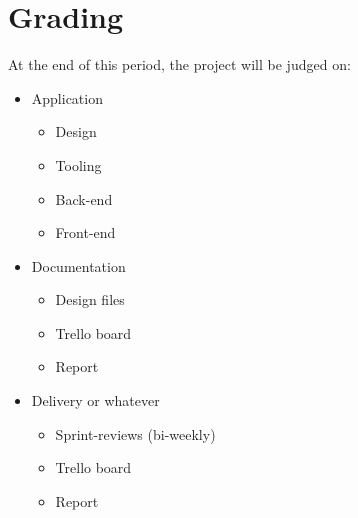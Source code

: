 \section{Grading}
At the end of this period, the project will be judged on:

\begin{itemize}
  \item Application
    \begin{itemize}
      \item{Design}
      \item{Tooling}
      \item{Back-end}
      \item{Front-end}
    \end{itemize}
  \item {Documentation}
    \begin{itemize}
      \item{Design files}
      \item{Trello board}
      \item{Report}
    \end{itemize}
  \item Delivery or whatever
    \begin{itemize}
      \item{Sprint-reviews (bi-weekly)}
      \item{Trello board}
      \item{Report}
    \end{itemize}
\end{itemize}
\clearpage
